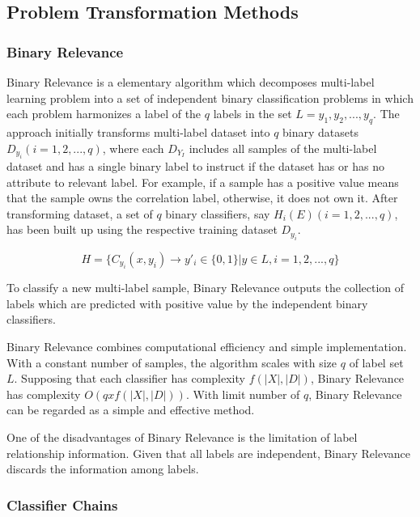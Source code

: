\subsection{Problem Transformation Methods}

\subsubsection{Binary Relevance}

Binary Relevance is a elementary algorithm which decomposes multi-label learning problem into a set of independent binary classification problems in which each problem harmonizes a label of the $q$ labels in the set $L = {y_{1}, y_{2},...,y_{q}}$. The approach initially transforms multi-label dataset into $q$ binary datasets $D_{y_{i}} (i = 1,2,...,q)$, where each $D_{Y_{I}}$ includes all samples of the multi-label dataset and has a single binary label to instruct if the dataset has or has no attribute to relevant label. For example, if a sample has a positive value means that the sample owns the correlation label, otherwise, it does not own it. After transforming dataset, a set of $q$ binary classifiers, say $H_{i}(E) (i = 1,2,...,q)$, has been built up using the respective training dataset $D_{y_{i}}$. 

\begin{equation}\label{eq:BinaryRelevance}
H = \{C_{y_{i}}(x, y_{i}) \to y'_{i} \in \{0,1\}| y \in L, i = 1,2,...,q\}
\end{equation}

To classify a new multi-label sample, Binary Relevance outputs the collection of labels which are predicted with positive value by the independent binary classifiers.

Binary Relevance combines computational efficiency and simple implementation. With a constant number of samples, the algorithm scales with size $q$ of label set $L$. Supposing that each classifier has complexity $f(|X|,|D|)$, Binary Relevance has complexity $O(qxf(|X|,|D|))$. With limit number of $q$, Binary Relevance can be regarded as a simple and effective method.

One of the disadvantages of Binary Relevance is the limitation of label relationship information. Given that all labels are independent, Binary Relevance discards the information among labels.

\subsubsection{Classifier Chains}

